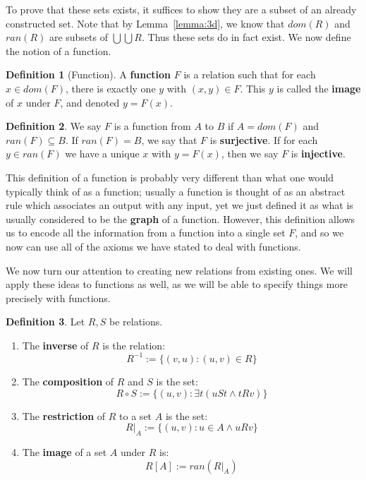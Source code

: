 \documentclass[11pt, oneside]{article}   	%
\theoremstyle{definition}
\newtheorem{definition}{Definition}[section]
\begin{document}
To prove that these sets exists, it suffices to show they are a subset of an already constructed set. Note that by 
Lemma~\ref{lemma:3d}, we know that $dom(R)$ and $ran(R)$ are subsets of $\bigcup\bigcup R$. Thus these sets do in 
fact exist. We now define the notion of a function.

\begin{definition}[Function]
	A \textbf{function} $F$ is a relation such that for each $x\in dom(F)$, there is exactly one $y$ with $(x, y)\in F$. This 
	$y$ is called the \textbf{image} of $x$ under $F$, and denoted $y = F(x)$. 
\end{definition}

\begin{definition}
	We say $F$ is a function from $A$ to $B$ if $A = dom(F)$ and $ran(F) \subseteq B$. If $ran(F) = B$, we say that $F$ is 
	\textbf{surjective}. If for each $y\in ran(F)$ we have a unique $x$ with $y = F(x)$, then we say $F$ is \textbf{injective}. 
\end{definition}

This definition of a function is probably very different than what one would typically think of as a function; usually a function 
is thought of as an abstract rule which associates an output with any input, yet we just defined it as what is usually considered 
to be the \textbf{graph} of a function. However, this definition allows us to encode all the information from a function into a 
single set $F$, and so we now can use all of the axioms we have stated to deal with functions. 

We now turn our attention to creating new relations from existing ones. We will apply these ideas to functions as well, as we will 
be able to specify things more precisely with functions.

\begin{definition}
	Let $R, S$ be relations.
	\begin{enumerate}
		\item The \textbf{inverse} of $R$ is the relation:
		\begin{equation}
			R^{-1} := \{(v, u) : (u, v)\in R\}
		\end{equation}
		\item The \textbf{composition} of $R$ and $S$ is the set:
		\begin{equation}
			R\circ S := \{(u, v) : \exists t (uSt\wedge tRv)\}
		\end{equation}
		\item The \textbf{restriction} of $R$ to a set $A$ is the set:
		\begin{equation}
			R|_A := \{(u, v) : u\in A\wedge uRv\}
		\end{equation}
		\item The \textbf{image} of a set $A$ under $R$ is:
		\begin{equation}
			R[A] := ran(R|_A)
		\end{equation}
	\end{enumerate}
\end{definition}
\end{document}
